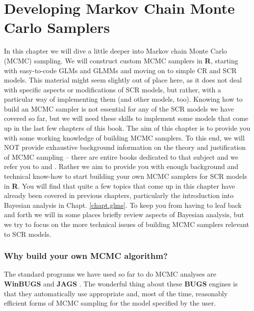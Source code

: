 \chapter{
Developing Markov Chain Monte Carlo Samplers
}
\label{chapt.mcmc}


\vspace{.3in}

In this chapter we will dive a little deeper into Markov chain Monte
Carlo (MCMC) sampling. We will construct custom MCMC samplers in {\bf
  R}, starting with easy-to-code GLMs and GLMMs and moving on to
simple CR and SCR models. This material might seem slightly out of place here, as it does not deal with specific aspects or modifications of SCR models, but rather, with a particular way of implementing them (and other models, too). Knowing how to build an MCMC sampler is not essential for any of the SCR models we have covered so far, but we will need these skills to implement some models that come up in the last few chapters of this book. The aim of this chapter is to provide you with some working knowledge of building MCMC samplers. To this end, we will NOT provide
exhaustive background information on the theory and justification of
MCMC sampling -- there are entire books dedicated to that subject and
we refer you to \citet{robert_casella:2004} and
\citet{robert_casella:2010}. Rather we aim to provide you with enough
background and technical know-how to start building your own MCMC
samplers for SCR models in {\bf R}. You will find that quite a few
topics that come up in this chapter have already been covered in
previous chapters, particularly the introduction into Bayesian
analysis in Chapt. \ref{chapt.glms}. To keep you from having to leaf
back and forth we will in some places briefly review aspects of
Bayesian analysis, but we try to focus on the more technical issues of
building MCMC samplers relevant to SCR models.



\subsection{Why build your own MCMC algorithm?}

The standard programs we have used so far to do MCMC analyses are
{\bf WinBUGS} \citep{gilks_etal:1994} and {\bf JAGS}
\citep{plummer:2003}. The wonderful thing about these {\bf BUGS}
engines
is that they automatically use  appropriate and, most of the time, reasonably
efficient forms
of MCMC sampling for the model specified by the user.

